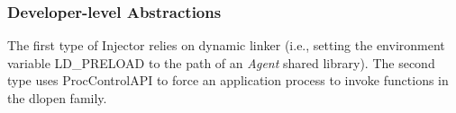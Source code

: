 \subsubsection{Developer-level Abstractions}

The first type of Injector relies on dynamic linker (i.e., setting the
environment variable LD\_PRELOAD to the path of an {\em Agent} shared library).
The second type uses ProcControlAPI to force an application process to invoke
functions in the dlopen family.
